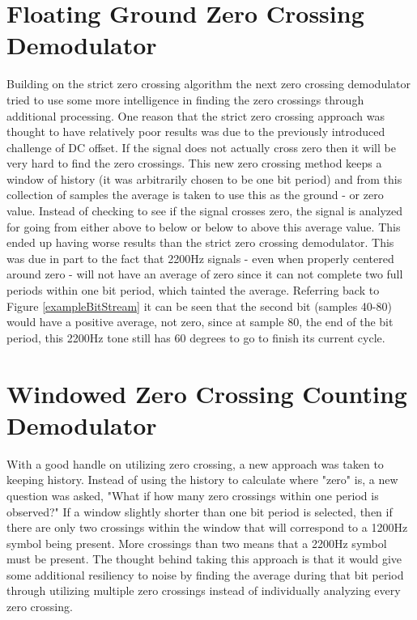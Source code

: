 \section{Floating Ground Zero Crossing Demodulator}
Building on the strict zero crossing algorithm the next zero crossing demodulator tried to use some more intelligence in finding the zero crossings through additional processing. One reason that the strict zero crossing approach was thought to have relatively poor results was due to the previously introduced challenge of DC offset. If the signal does not actually cross zero then it will be very hard to find the zero crossings. This new zero crossing method keeps a window of history (it was arbitrarily chosen to be one bit period) and from this collection of samples the average is taken to use this as the ground - or zero value. Instead of checking to see if the signal crosses zero, the signal is analyzed for going from either above to below or below to above this average value. This ended up having worse results than the strict zero crossing demodulator. This was due in part to the fact that 2200Hz signals - even when properly centered around zero - will not have an average of zero since it can not complete two full periods within one bit period, which tainted the average. Referring back to Figure \ref{exampleBitStream} it can be seen that the second bit (samples 40-80) would have a positive average, not zero, since at sample 80, the end of the bit period, this 2200Hz tone still has 60 degrees to go to finish its current cycle. 

\section{Windowed Zero Crossing Counting Demodulator}
With a good handle on utilizing zero crossing, a new approach was taken to keeping history. Instead of using the history to calculate where "zero" is, a new question was asked, "What if how many zero crossings within one period is observed?" If a window slightly shorter than one bit period is selected, then if there are only two crossings within the window that will correspond to a 1200Hz symbol being present. More crossings than two means that a 2200Hz symbol must be present. The thought behind taking this approach is that it would give some additional resiliency to noise by finding the average during that bit period through utilizing multiple zero crossings instead of individually analyzing every zero crossing. 

